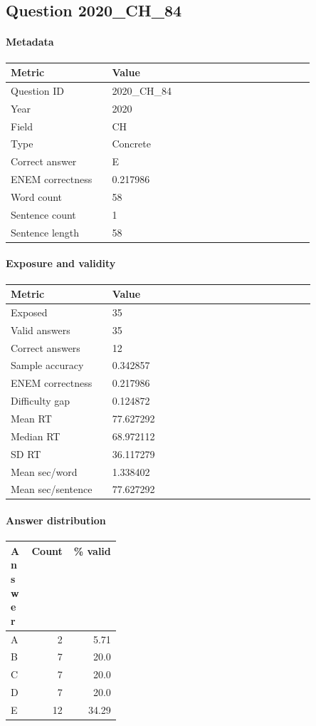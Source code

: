 \subsection*{Question 2020\_CH\_84}
\label{sec:q_2020_CH_84}
\paragraph{Metadata}
\begin{tabular}{p{0.30\linewidth}p{0.60\linewidth}}
\toprule
Metric & Value\\
\midrule
Question ID & 2020\_CH\_84\\
Year & 2020\\
Field & CH\\
Type & Concrete\\
Correct answer & E\\
ENEM correctness & 0.217986\\
Word count & 58\\
Sentence count & 1\\
Sentence length & 58\\
\bottomrule
\end{tabular}

\paragraph{Exposure and validity}
\begin{tabular}{p{0.30\linewidth}p{0.60\linewidth}}
\toprule
Metric & Value\\
\midrule
Exposed & 35\\
Valid answers & 35\\
Correct answers & 12\\
Sample accuracy & 0.342857\\
ENEM correctness & 0.217986\\
Difficulty gap & 0.124872\\
Mean RT & 77.627292\\
Median RT & 68.972112\\
SD RT & 36.117279\\
Mean sec/word & 1.338402\\
Mean sec/sentence & 77.627292\\
\bottomrule
\end{tabular}

\paragraph{Answer distribution}
\begin{tabular}{p{0.18\linewidth}rr}
\toprule
Answer & Count & \% valid\\
\midrule
A & 2 & 5.71\\
B & 7 & 20.0\\
C & 7 & 20.0\\
D & 7 & 20.0\\
E & 12 & 34.29\\
\bottomrule
\end{tabular}

